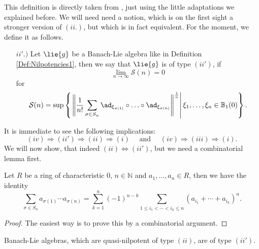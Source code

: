 \documentclass[
11pt,                          %
english                        %
]{article}
\begin{document}
This definition is directly taken from \cite{muller}, just using the little adaptations we explained before. We will need need a notion, which is on the first sight a stronger version of $(ii.)$, but which is in fact equivalent. For the moment, we define it as follows.
\begin{itemize}
	\item[$ii'.)$]
	Let $\lie{g}$ be a Banach-Lie algebra like in Definition 
	\ref{Def:Nilpotencies1}, then we say that $\lie{g}$ is of type $(ii')$, if
	\begin{equation*}
		\lim_{n \longrightarrow \infty}
		\mathcal{S}(n)
		=
		0
	\end{equation*}
	for
	\begin{equation}
		\mathcal{S}(n)
		=
		\sup \left\{ 
		\left.
			\left\Vert
				\frac{1}{n!}
				\sum\limits_{\sigma \in S_n}
				\ad_{\xi_{\sigma(1)}} \circ \ldots \circ \ad_{\xi_{\sigma(n)}}
			\right\Vert^{\frac{1}{n}} 
		\right|
			\xi_1, \ldots, \xi_n \in \mathbb{B}_1(0)
		\right\}.
	\end{equation}
\end{itemize}
It is immediate to see the following implications:
\begin{equation*}
	(iv) \Longrightarrow 
	(ii') \Longrightarrow 
	(ii) \Longrightarrow 
	(i)
	\quad \text{ and } \quad
	(iv) \Longrightarrow
	(iii) \Longrightarrow 
	(i).
\end{equation*}
We will now show, that indeed $(ii) \Longleftrightarrow (ii')$, but we need a combinatorial lemma first.
\begin{lemma}
	\label{lemma:symmetric-to-power}
	Let $R$ be a ring of characteristic $0$, $n\in \mathbb{N}$ and $a_1, 
	\ldots, a_n \in R$, then we have the identity
	\begin{equation*}
		\sum\limits_{\sigma \in S_n}
		a_{\sigma(1)} \cdots a_{\sigma(n)}
		=
		\sum\limits_{k = 1}^n
		(-1)^{n-k}
		\sum\limits_{1 \leq i_1 < \cdots < i_k \leq n}
		(a_{i_1} + \cdots + a_{i_k})^n.
	\end{equation*}
\end{lemma}
\begin{proof}
	The easiest way is to prove this by a combinatorial argument.
\end{proof}
\begin{proposition}
	\label{prop:type-2-is-2prime}
	Banach-Lie algebras, which are quasi-nilpotent of type $(ii)$, are of type 
	$(ii')$.
\end{proposition}
\end{document}

